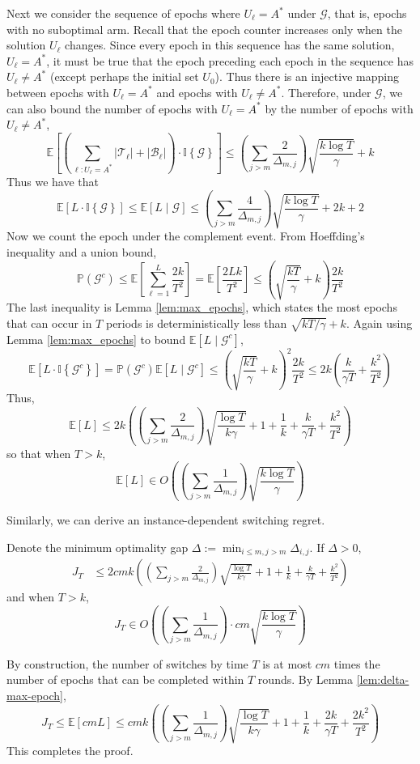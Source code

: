 \documentclass[opre,blindrev]{informs3}
\newcommand{\ind}[1]{\mathbb{I}\left\{#1\right\}}
\newcommand{\bE}[1]{{\mathbb{E}\left[#1\right]}}
\newcommand{\bP}[1]{{\mathbb{P}\left(#1\right)}}
\begin{document}
\begin{APPENDICES}
    Next we consider the sequence of epochs where \(U_{\ell}=A^*\) under \(\mathcal{G}\), that is, epochs with no suboptimal arm. Recall that the epoch counter increases only when the solution \(U_{\ell}\) changes. Since every epoch in this sequence has the same solution, \(U_{\ell}= A^*\), it must be true that the epoch preceding each epoch in the sequence has \(U_{\ell}\neq A^*\) (except perhaps the initial set \(U_0\)). Thus there is an injective mapping between epochs with \(U_{\ell}=A^*\) and epochs with \(U_{\ell}\neq A^*\). Therefore, under \(\mathcal{G}\), we can also bound the number of epochs with \(U_{\ell}=A^*\) by the number of epochs with \(U_{\ell}\neq A^*\),
    \[\bE{\left(\sum_{\ell:U_{\ell}= A^*}|\mathcal{T}_{\ell}|+|\mathcal{B}_{\ell}|\right)\cdot \ind{\mathcal{G}}}\leq \left(\sum_{j>m}\frac{2}{\Delta_{m,j}}\right)\sqrt{\frac{k\log T}{\gamma}}+k\]
    Thus we have that 
    \[\bE{L\cdot \ind{\mathcal{G}}}\leq \bE{L\mid \mathcal{G}}\leq \left(\sum_{j>m}\frac{4}{\Delta_{m,j}}\right)\sqrt{\frac{k\log T}{\gamma}}+2k+2\]
    Now we count the epoch under the complement event. From Hoeffding's inequality and a union bound,
    \[\bP{\mathcal{G}^c}\leq \bE{\sum_{\ell=1}^L \frac{2k}{T^2}}=\bE{\frac{2Lk}{T^2}}\leq \left(\sqrt{\frac{kT}{\gamma}}+k\right)\frac{2k}{T^2}\]
    The last inequality is Lemma \ref{lem:max_epochs}, which states the most epochs that can occur in \(T\) periods is deterministically less than \(\sqrt{kT /\gamma}+k\).
    Again using Lemma \ref{lem:max_epochs} to bound \(\bE{L\mid \mathcal{G}^c}\),
    \[\bE{L\cdot \ind{\mathcal{G}^c}}=\bP{\mathcal{G}^c}\bE{L\mid \mathcal{G}^c}\leq \left(\sqrt{\frac{kT}{\gamma}}+k\right)^2\frac{2k}{T^2}\leq 2k\left(\frac{k}{\gamma T}+\frac{k^2}{T^2}\right)\]
    Thus,
    \[\bE{L}\leq 2k\left(\left(\sum_{j>m}\frac{2}{\Delta_{m,j}}\right)\sqrt{\frac{\log T}{k\gamma}}+1+\frac{1}{k}+\frac{k}{\gamma T}+\frac{k^2}{T^2}\right)\]
    so that when \(T> k\),
    \[\bE{L}\in O\left(\left(\sum_{j>m}\frac{1}{\Delta_{m,j}}\right)\sqrt{\frac{k\log T}{\gamma}}\right)\]
\Halmos

Similarly, we can derive an instance-dependent switching regret.
\begin{lemma}\label{lem:delta-sc-bound-final}
    Denote the minimum optimality gap \(\Delta:=\min_{i\leq m, j>m}\Delta_{i,j}\). If \(\Delta>0\),
    \begin{align*}
        J_T&\leq 2cmk\left(\left(\sum_{j>m}\frac{2}{\Delta_{m,j}}\right)\sqrt{\frac{\log T}{k\gamma}}+1+\frac{1}{k}+\frac{k}{\gamma T}+\frac{k^2}{T^2}\right)
    \end{align*}
    and when \(T>k\),
    \[J_T\in O\left(\left(\sum_{j>m}\frac{1}{\Delta_{m,j}}\right)\cdot cm\sqrt{\frac{k\log T}{\gamma}}\right)\]
\end{lemma}
    By construction, the number of switches by time \(T\) is at most \(cm\) times the number of epochs that can be completed within \(T\) rounds. By Lemma \ref{lem:delta-max-epoch},
    \[J_T\leq \bE{cmL}\leq cmk\left(\left(\sum_{j>m}\frac{1}{\Delta_{m,j}}\right)\sqrt{\frac{\log T}{k\gamma}}+1+\frac{1}{k}+\frac{2k}{\gamma T}+\frac{2k^2}{T^2}\right)\]
This completes the proof. 
\Halmos  



\end{APPENDICES}
\end{document}
